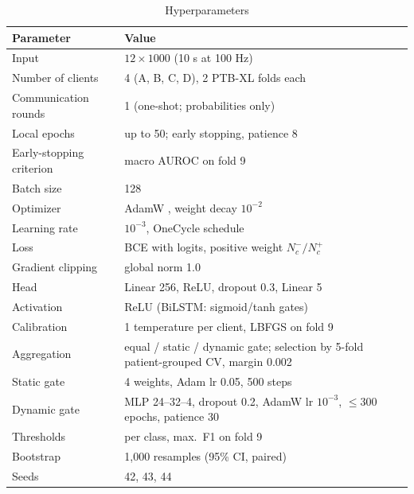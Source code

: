 \begin{table}[!t]
\centering
\caption{Hyperparameters}
\label{tab:hyper}
\footnotesize
\begin{tabular}{@{}p{3.3cm}p{4.7cm}@{}}
\toprule
Parameter & Value \\
\midrule
Input & $12\times1000$ (10 s at 100 Hz) \\
Number of clients & 4 (A, B, C, D), 2 PTB-XL folds each \\
Communication rounds & 1 (one-shot; probabilities only) \\
Local epochs & up to 50; early stopping, patience 8 \\
Early-stopping criterion & macro AUROC on fold 9 \\
Batch size & 128 \\
Optimizer & AdamW \cite{loshchilov2019adamw}, weight decay $10^{-2}$ \\
Learning rate & $10^{-3}$, OneCycle schedule \cite{smith2019superconvergence} \\
Loss & BCE with logits, positive weight $N^-_c/N^+_c$ \\
Gradient clipping & global norm 1.0 \\
Head & Linear 256, ReLU, dropout 0.3, Linear 5 \\
Activation & ReLU (BiLSTM: sigmoid/tanh gates) \\
Calibration & 1 temperature per client, LBFGS on fold 9 \\
Aggregation & equal / static / dynamic gate; selection by 5-fold patient-grouped CV, margin 0.002 \\
Static gate & 4 weights, Adam lr 0.05, 500 steps \\
Dynamic gate & MLP 24--32--4, dropout 0.2, AdamW lr $10^{-3}$, $\le$300 epochs, patience 30 \\
Thresholds & per class, max.\ F1 on fold 9 \\
Bootstrap & 1,000 resamples (95\% CI, paired) \\
Seeds & 42, 43, 44 \\
\bottomrule
\end{tabular}
\end{table}

